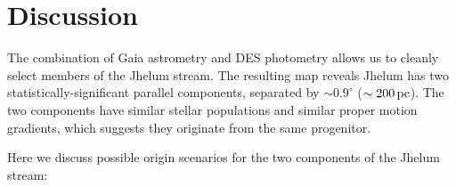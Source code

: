 \documentclass[twocolumn]{aastex62}
\begin{document}
\section{Discussion}
\label{sec:discussion}
The combination of Gaia astrometry and DES photometry allows us to cleanly select members of the Jhelum stream.
The resulting map reveals Jhelum has two statistically-significant parallel components, separated by $\sim0.9^\circ$ ($\sim200\,\rm pc$).
The two components have similar stellar populations and similar proper motion gradients, which suggests they originate from the same progenitor.

Here we discuss possible origin scenarios for the two components of the Jhelum stream:
\end{document}
